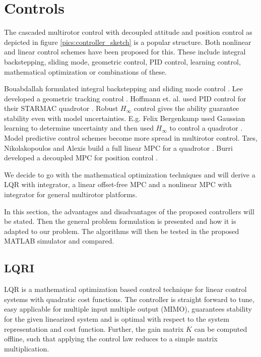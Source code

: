 \chapter{Controls}
\label{sec:controls}
The cascaded multirotor control with decoupled attitude and position control as depicted in figure \ref{pics:controller_sketch} is a popular structure. Both nonlinear and linear control schemes have been proposed for this. These include integral backstepping, sliding mode, geometric control, PID control, learning control, mathematical optimization or combinations of these.

Bouabdallah formulated integral backstepping and sliding mode control \cite{Bouabdallah2005,Bouabdallah2007}. Lee developed a geometric tracking control \cite{Lee2010}. Hoffmann et. al. used PID control for their STARMAC quadrotor \cite{Hoffmann2007}. Robust $H_\infty$ control gives the ability guarantee stability even with model uncertainties. E.g. Felix Bergenkamp used Gaussian learning to determine uncertainty and then used $H_\infty$ to control a quadrotor \cite{Berkenkamp2014,www:robustquad}. Model predictive control schemes become more spread in multirotor control. Tzes, Nikolakopoulos and Alexis build a full linear MPC for a quadrotor \cite{Tzes2012}. Burri developed a decoupled MPC for position control \cite{Burri2012}. 

We decide to go with the mathematical optimization techniques and will derive a LQR with integrator, a linear offset-free MPC and a nonlinear MPC with integrator for general multirotor platforms. 

In this section, the advantages and disadvantages of the proposed controllers will be stated. Then the general problem formulation is presented and how it is adapted to our problem. The algorithms will then be tested in the proposed MATLAB simulator and compared.

\section{LQRI} 
LQR is a mathematical optimization based control technique for linear control systems with quadratic cost functions. The controller is straight forward to tune, easy applicable for multiple input multiple output (MIMO), guarantees stability for the given linearized system and is optimal with respect to the system representation and cost function. Further, the gain matrix $K$ can be computed offline, such that applying the control law reduces to a simple matrix multiplication.

